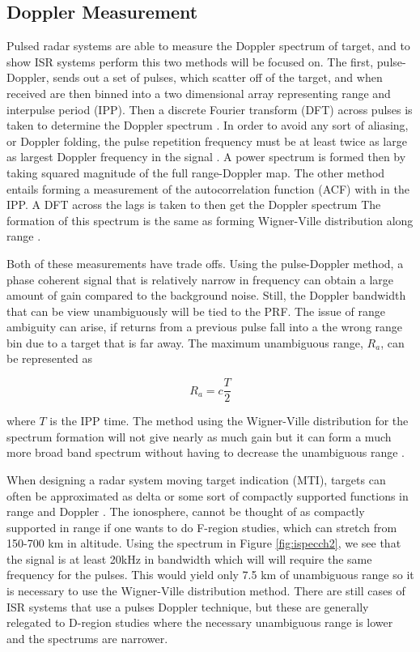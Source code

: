\subsection{Doppler Measurement}

Pulsed radar systems are able to measure the Doppler spectrum of target, and to show ISR systems perform this two methods will be focused on. The first, pulse-Doppler, sends out a set of pulses, which scatter off of the target, and when received are then binned into a two dimensional array representing range and interpulse period (IPP). Then a discrete Fourier transform (DFT) across pulses is taken to determine the Doppler spectrum \cite{richards2014fundamentals}. In order to avoid any sort of aliasing, or Doppler folding, the pulse repetition frequency must be at least twice as large as largest Doppler frequency in the signal \cite{dtsp:openhiem}. A power spectrum is formed then by taking squared magnitude of the full range-Doppler map. The other method entails forming a measurement of the autocorrelation function (ACF) with in the IPP. A DFT across the lags is taken to then get the Doppler spectrum The formation of this spectrum is the same as forming Wigner-Ville distribution along range \cite{TFAcohen}.

Both of these measurements have trade offs. Using the pulse-Doppler method, a phase coherent signal that is relatively narrow in frequency can obtain a large amount of gain compared to the background noise. Still, the Doppler bandwidth that can be view unambiguously will be tied to the PRF. The issue of range ambiguity can arise, if returns from a previous pulse fall into a the wrong range bin due to a target that is far away. The maximum unambiguous range, $R_a$, can be represented as 

\begin{equation}
\label{eqn:maxuar}
R_a = c \frac{T}{2}
\end{equation}

\noindent where $T$ is the IPP time. The method using the Wigner-Ville distribution for the spectrum formation will not give nearly as much gain but it can form a much more broad band spectrum without having to decrease the unambiguous range \cite{richards2014fundamentals}.

 When designing a radar system moving target indication (MTI), targets can often be approximated as delta or some sort of compactly supported functions in range and Doppler \cite{richards2014fundamentals}. The ionosphere, cannot be thought of as compactly supported in range if one wants to do F-region studies, which can stretch from 150-700 km in altitude. Using the spectrum in Figure \ref{fig:ispecch2}, we see that the signal is at least 20kHz in bandwidth which will will require the same frequency for the pulses. This would yield only 7.5 km of unambiguous range so it is necessary to use the Wigner-Ville distribution method. There are still cases of ISR systems that use a pulses Doppler technique, but these are generally relegated to D-region studies where the necessary unambiguous range is lower and the spectrums are narrower.


